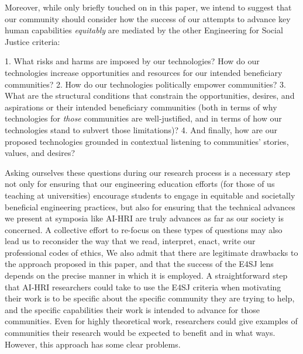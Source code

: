 \documentclass[letterpaper]{article} %
\begin{document}
Moreover, while only briefly touched on in this paper, we intend to suggest that our community should consider how the success of our attempts to advance key human capabilities \textit{equitably} are mediated by the other Engineering for Social Justice criteria:
\begin{enumerate}
1. What risks and harms are imposed by our technologies? How do our technologies increase opportunities and resources for our intended beneficiary communities?
2. How do our technologies politically empower communities?
3. What are the structural conditions that constrain the opportunities, desires, and aspirations or their intended beneficiary communities (both in terms of why technologies for \textit{those} communities are well-justified, and in terms of how our technologies stand to subvert those limitations)?
4. And finally, how are our proposed technologies grounded in contextual listening to communities' stories, values, and desires?
\end{enumerate}
Asking ourselves these questions during our research process is a necessary step not only for ensuring that our engineering education efforts (for those of us teaching at universities) encourage students to engage in equitable and societally beneficial engineering practices, but also for ensuring that the technical advances we present at symposia like AI-HRI are truly advances as far as our society is concerned. A collective effort to re-focus on these types of questions may also lead us to reconsider the way that we read, interpret, enact, write our professional codes of ethics,
We also admit that there are legitimate drawbacks to the approach proposed in this paper, and that the success of the E4SJ lens depends on the precise manner in which it is employed. A straightforward step that AI-HRI researchers could take to use the E4SJ criteria when motivating their work is to be specific about the specific community they are trying to help, and the specific capabilities their work is intended to advance for those communities. Even for highly theoretical work, researchers could give examples of communities their research would be expected to benefit and in what ways. However, this approach has some clear problems.
\end{document}
